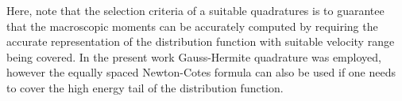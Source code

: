 \documentclass{rsproca}%
\begin{document}

Here, note that the selection criteria of a suitable quadratures is to guarantee that the macroscopic moments can be accurately computed by requiring the accurate representation of the distribution function with suitable velocity range being covered. In the present work Gauss-Hermite quadrature was employed, however the equally spaced Newton-Cotes formula can also be used if one needs to cover the high energy tail of the distribution function.
\end{document}
